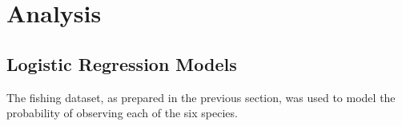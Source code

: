 \section{Analysis}


\subsection{Logistic Regression Models}

The fishing dataset, as prepared in the previous section, was used to model the probability of observing each of the six species.


%
%
%
%
%
%
%
%
%
